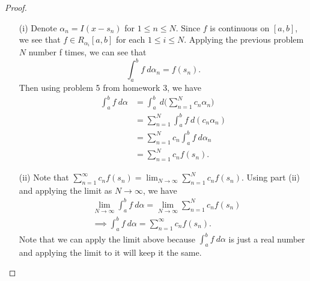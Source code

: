 \documentclass[a4paper]{article}
\begin{document}
\begin{proof}
    \begin{enumerate}
        \item[(i)] Denote \( {\alpha}_{n} = I(x - {s}_{n}) \) for \( 1 \leq n \leq N  \). Since \( f  \) is continuous on \( [a,b] \), we see that \( f \in R_{{\alpha}_{i}}[a,b] \) for each \( 1 \leq i \leq N \). Applying the previous problem \( N \) number f times, we can see that 
\[  \int_{ a }^{ b } f  \ d \alpha_n = f({s}_{n}).   \]
    Then using problem 5 from homework 3, we have
    \begin{align*}
        \int_{ a }^{ b } f \ d \alpha &= \int_{ a }^{ b }  \ d \Big(  \sum_{ n=1  }^{ N } {c}_{n} {\alpha}_{n} \Big) \\
                                      &= \sum_{ n=1  }^{ N } \int_{ a }^{ b } f  \ d ({c}_{n} {\alpha}_{n}) \\
                                      &= \sum_{ n=1 }^{ N } {c}_{n} \int_{ a }^{ b } f   \ d {\alpha}_{n} \\
                                      &= \sum_{ n=1  }^{ N  } {c}_{n} f({s}_{n}).
    \end{align*}
\item[(ii)] Note that \( \sum_{ n=1  }^{ \infty  } {c}_{n} f({s}_{n}) = \lim_{ N \to \infty  }  \sum_{ n=1  }^{ N  } {c}_{n} f({s}_{n}) \). Using part (ii) and applying the limit as \( N \to \infty  \), we have 
    \begin{align*}
    &\lim_{ N \to \infty  }  \int_{ a }^{ b } f  \ d \alpha = \lim_{ N \to \infty  } \sum_{ n=1 }^{  N  } {c}_{n} f({s}_{n}) \\
    &\implies \int_{ a }^{ b } f  \ d \alpha = \sum_{ n=1  }^{ \infty  }{c}_{n} f({s}_{n}).
    \end{align*}
    Note that we can apply the limit above because \( \int_{ a }^{ b } f  \ d \alpha \) is just a real number and applying the limit to it will keep it the same.
    \end{enumerate}
    
\end{proof}
\end{document}
